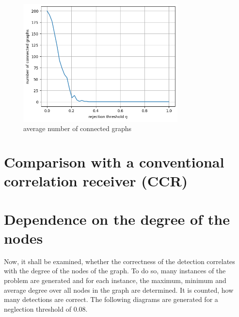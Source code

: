 \documentclass{article}
\begin{document}
	\begin{figure}[h]
		\centering
		\includegraphics[width=0.75\textwidth]{img/N_connected_rule_1.png}
		\caption{average number of connected graphs}
		\label{fig:N }
	\end{figure}
	
	\section{Comparison with a conventional correlation receiver (CCR)}
	
	\section{Dependence on the degree of the nodes}
	Now, it shall be examined, whether the correctness of the detection correlates with the degree of the nodes of the graph.  To do so, many instances of the problem are generated and for each instance, the maximum, minimum and average degree over all nodes in the graph are determined. It is counted, how many detections are correct. The following diagrams are generated for a neglection threshold of 0.08.
	
\end{document}
